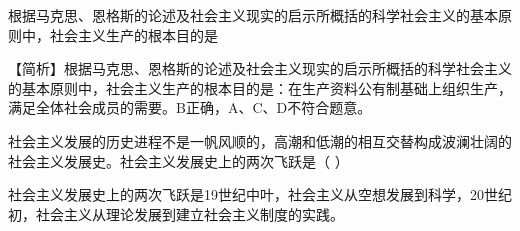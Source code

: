 \question 根据马克思、恩格斯的论述及社会主义现实的启示所概括的科学社会主义的基本原则中，社会主义生产的根本目的是
\par{}
\begin{solution}【简析】根据马克思、恩格斯的论述及社会主义现实的启示所概括的科学社会主义的基本原则中，社会主义生产的根本目的是：在生产资料公有制基础上组织生产，满足全体社会成员的需要。B正确，A、C、D不符合题意。
\end{solution}
\question 社会主义发展的历史进程不是一帆风顺的，高潮和低潮的相互交替构成波澜壮阔的社会主义发展史。社会主义发展史上的两次飞跃是（
）
\par{}
\begin{solution}社会主义发展史上的两次飞跃是19世纪中叶，社会主义从空想发展到科学，20世纪初，社会主义从理论发展到建立社会主义制度的实践。
\end{solution}
